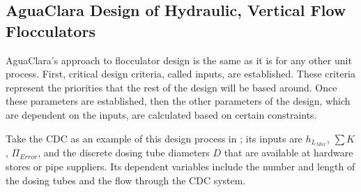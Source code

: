 \documentclass[letterpaper,10pt,english]{sphinxmanual}
\begin{document}
\subsection{AguaClara Design of Hydraulic, Vertical Flow Flocculators}
\label{\detokenize{Flocculation/Floc_Design:aguaclara-design-of-hydraulic-vertical-flow-flocculators}}
AguaClara’s approach to flocculator design is the same as it is for any other unit process. First, critical design criteria, called inputs, are established. These criteria represent the priorities that the rest of the design will be based around. Once these parameters are established, then the other parameters of the design, which are dependent on the inputs, are calculated based on certain constraints.

Take the CDC as an example of this design process in {\hyperref[\detokenize{Flow_Control_and_Measurement/FCM_Design:title-flow-control-design}]{}}; its inputs are \(h_{L_{Max}}\), \(\sum K\), \(\Pi_{Error}\), and the discrete dosing tube diameters  \(D\) that are available at hardware stores or pipe suppliers. Its dependent variables include the number and length of the dosing tubes and the flow through the CDC system.
\end{document}
